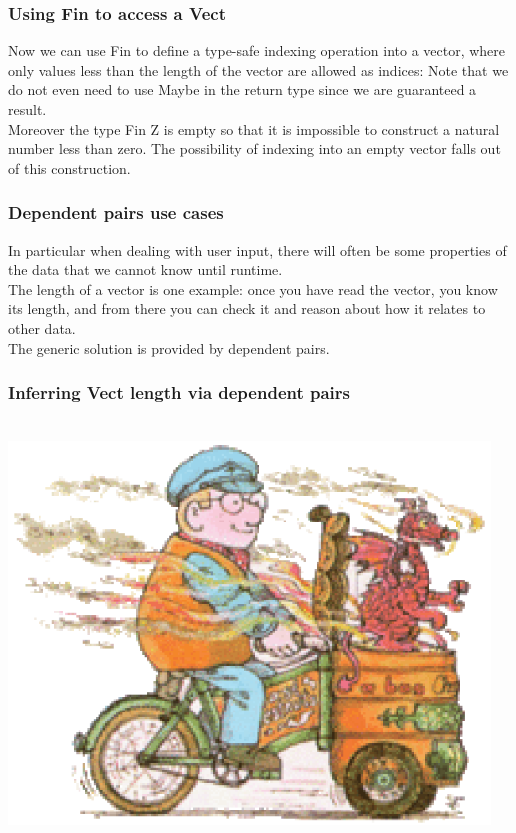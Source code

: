 \begin{frame}
\frametitle{Using Fin to access a Vect}
Now we can use Fin to define a type-safe indexing operation into a vector, where only values less than the length of the vector are allowed as indices:
Note that we do not even need to use Maybe in the return type since we are guaranteed a result.
\\ \medskip
Moreover the type Fin Z is empty so that it is impossible to construct a natural number less than zero. The possibility of indexing into an empty vector falls out of this construction. 
\end{frame}


\begin{frame}
\frametitle{Dependent pairs use cases}
In particular when dealing with user input, 
there will often be some properties of the data that we
cannot know until runtime.
\\ \medskip
The length of a vector is one example: once you have read the
vector, you know its length, and from there you can check it and reason about how it relates to other data.\\ \medskip
The generic solution is provided by dependent pairs.
\end{frame}

\begin{frame}
\frametitle{Inferring Vect length via dependent pairs}
\end{frame}


\begin{frame}
\frametitle{}%
\begin{columns}
	\begin{column}{0.5\textwidth}
		\includegraphics[height=1\textwidth,width=1\textwidth]{img/idris-toon.eps}
	\end{column}
	\begin{column}{0.5\textwidth}
    \end{column}
\end{columns}
\end{frame}